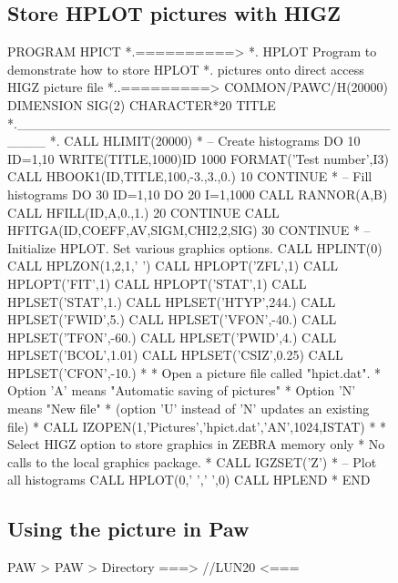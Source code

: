 \begin{figure}[t]
\begin{minipage}[t]{.49\textwidth}
\subsection*{Store HPLOT pictures with HIGZ}
\begin{talltt}
      PROGRAM HPICT
*.==========>
*.  HPLOT Program to demonstrate how to store HPLOT
*.  pictures onto direct access HIGZ picture file
*..=========>
      COMMON/PAWC/H(20000)
      DIMENSION SIG(2)
      CHARACTER*20 TITLE
*.___________________________________________
*.
      CALL HLIMIT(20000)
* --        Create histograms
      DO 10 ID=1,10
         WRITE(TITLE,1000)ID
 1000    FORMAT('Test number',I3)
         CALL HBOOK1(ID,TITLE,100,-3.,3.,0.)
  10  CONTINUE
* --        Fill histograms
      DO 30 ID=1,10
         DO 20 I=1,1000
            CALL RANNOR(A,B)
            CALL HFILL(ID,A,0.,1.)
  20     CONTINUE
         CALL HFITGA(ID,COEFF,AV,SIGM,CHI2,2,SIG)
  30  CONTINUE
* --       Initialize HPLOT. Set various graphics options.
      CALL HPLINT(0)
      CALL HPLZON(1,2,1,' ')
      CALL HPLOPT('ZFL',1)
      CALL HPLOPT('FIT',1)
      CALL HPLOPT('STAT',1)
      CALL HPLSET('STAT',1.)
      CALL HPLSET('HTYP',244.)
      CALL HPLSET('FWID',5.)
      CALL HPLSET('VFON',-40.)
      CALL HPLSET('TFON',-60.)
      CALL HPLSET('PWID',4.)
      CALL HPLSET('BCOL',1.01)
      CALL HPLSET('CSIZ',0.25)
      CALL HPLSET('CFON',-10.)
*
*   Open a picture file called "hpict.dat".
*   Option 'A' means "Automatic saving of pictures"
*   Option 'N' means "New file"
*   (option 'U' instead of 'N' updates an existing file)
*
      CALL IZOPEN(1,'Pictures','hpict.dat','AN',1024,ISTAT)
*
*   Select HIGZ option to store graphics in ZEBRA memory only
*   No calls to the local graphics package.
*
      CALL IGZSET('Z')
* --      Plot all histograms
      CALL HPLOT(0,' ',' ',0)
      CALL HPLEND
*
      END
\end{talltt}
\end{minipage} \hfill
\begin{minipage}[t]{.49\textwidth}
\subsection*{Using the picture in Paw}
\begin{talltt}
PAW > 
PAW > 
            Directory ===> //LUN20 <===
 

\end{talltt}
\end{minipage}
\end{figure}
